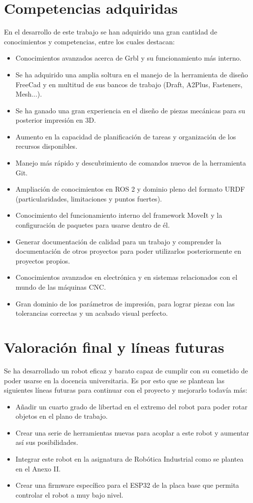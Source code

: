\section{Competencias adquiridas}
En el desarrollo de este trabajo se han adquirido una gran cantidad de conocimientos y competencias, 
entre los cuales destacan:
\begin{itemize}
\item Conocimientos avanzados acerca de Grbl y su funcionamiento más interno.
\item Se ha adquirido una amplia soltura en el manejo de la herramienta de diseño FreeCad y en multitud de sus bancos de trabajo (Draft, A2Plus, Fasteners, Mesh...).
\item Se ha ganado una gran experiencia en el diseño de piezas mecánicas para su posterior impresión en 3D.
\item Aumento en la capacidad de planificación de tareas y organización de los recursos disponibles.
\item Manejo más rápido y descubrimiento de comandos nuevos de la herramienta Git.
\item Ampliación de conocimientos en ROS 2 y dominio pleno del formato URDF (particularidades, limitaciones y puntos fuertes).
\item Conocimiento del funcionamiento interno del framework MoveIt y la configuración de paquetes para usarse dentro de él.
\item Generar documentación de calidad para un trabajo y comprender la documentación de otros proyectos para poder 
utilizarlos posteriormente en proyectos propios.
\item Conocimientos avanzados en electrónica y en sistemas relacionados con el mundo de las máquinas CNC.
\item Gran dominio de los parámetros de impresión, para lograr piezas con las tolerancias correctas y un acabado visual perfecto. 
\end{itemize}


\section{Valoración final y líneas futuras}
Se ha desarrollado un robot eficaz y barato capaz de cumplir con su cometido de poder usarse en la docencia universitaria. Es por esto 
que se plantean las siguientes líneas futuras para continuar con el proyecto y mejorarlo todavía más:

\begin{itemize}
    \item Añadir un cuarto grado de libertad en el extremo del robot para poder rotar objetos en el plano de trabajo.
    \item Crear una serie de herramientas nuevas para acoplar a este robot y aumentar así sus posibilidades.
    \item Integrar este robot en la asignatura de Robótica Industrial como se plantea en el Anexo II. 
    \item Crear una firmware específico para el ESP32 de la placa base que permita controlar el robot a muy bajo nivel.
\end{itemize}


